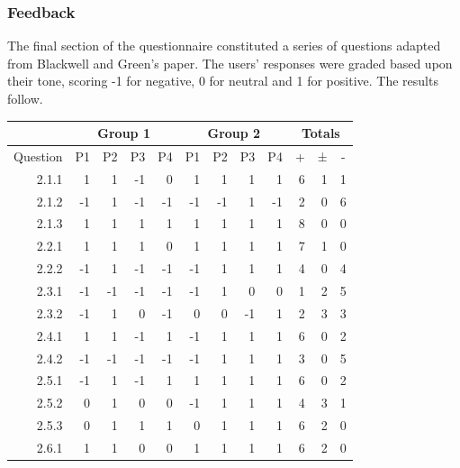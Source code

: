 \documentclass[12pt,twoside,notitlepage,xetex]{report}
\begin{document}
\subsubsection{Feedback}

The final section of the questionnaire constituted a series of questions adapted from Blackwell and Green's paper. \cite{Blackwell2000}  The users' responses were graded based upon their tone, scoring -1 for negative, 0 for neutral and 1 for positive.  The results follow.

\begin{center}
\begin{table}[H]
\begin{center}
\begin{tabular}{|r||r|r|r|r||r|r|r|r||r|r|r|}
\cline{2-12}
\multicolumn{1}{c}{} & \multicolumn{4}{|c|}{Group 1} & \multicolumn{4}{c||}{Group 2} & \multicolumn{3}{c|}{Totals}\\ \hline
\multicolumn{1}{|c||}{Question} & \multicolumn{1}{c|}{P1} & \multicolumn{1}{c|}{P2} & \multicolumn{1}{c|}{P3} & \multicolumn{1}{c||}{P4} & \multicolumn{1}{c|}{P1} & \multicolumn{1}{c|}{P2} & \multicolumn{1}{c|}{P3} & \multicolumn{1}{c||}{P4} & \multicolumn{1}{c|}{+} & \multicolumn{1}{c|}{±} & \multicolumn{1}{c|}{-}\\ \hline \hline
2.1.1 & 1 & 1 & -1 & 0 & 1 & 1 & 1 & 1 & 6 & 1 & 1\\ \hline
2.1.2 & -1 & 1 & -1 & -1 & -1 & -1 & 1 & -1 & 2 & 0 & 6\\ \hline
2.1.3 & 1 & 1 & 1 & 1 & 1 & 1 & 1 & 1 & 8 & 0 & 0\\ \hline
2.2.1 & 1 & 1 & 1 & 0 & 1 & 1 & 1 & 1 & 7 & 1 & 0\\ \hline
2.2.2 & -1 & 1 & -1 & -1 & -1 & 1 & 1 & 1 & 4 & 0 & 4\\ \hline
2.3.1 & -1 & -1 & -1 & -1 & -1 & 1 & 0 & 0 & 1 & 2 & 5\\ \hline
2.3.2 & -1 & 1 & 0 & -1 & 0 & 0 & -1 & 1 & 2 & 3 & 3\\ \hline
2.4.1 & 1 & 1 & -1 & 1 & -1 & 1 & 1 & 1 & 6 & 0 & 2\\ \hline
2.4.2 & -1 & -1 & -1 & -1 & -1 & 1 & 1 & 1 & 3 & 0 & 5\\ \hline
2.5.1 & -1 & 1 & -1 & 1 & 1 & 1 & 1 & 1 & 6 & 0 & 2\\ \hline
2.5.2 & 0 & 1 & 0 & 0 & -1 & 1 & 1 & 1 & 4 & 3 & 1\\ \hline
2.5.3 & 0 & 1 & 1 & 1 & 0 & 1 & 1 & 1 & 6 & 2 & 0\\ \hline
2.6.1 & 1 & 1 & 0 & 0 & 1 & 1 & 1 & 1 & 6 & 2 & 0\\ \hline

\end{tabular}
\end{center}
\end{table}
\end{center}
\end{document}
